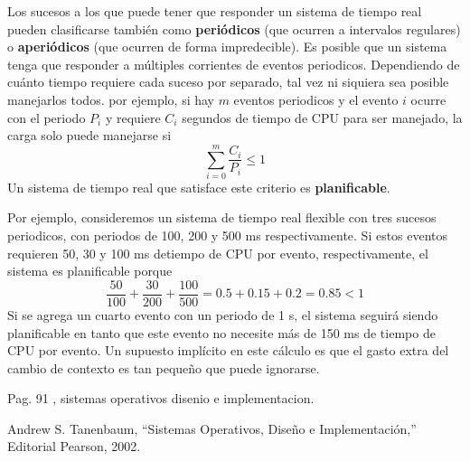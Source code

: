 \documentclass{article}
\begin{document}
Los sucesos a los que puede tener que responder un sistema de tiempo real 
pueden clasif\/icarse tambi\'en como {\bf peri\'odicos} (que ocurren a intervalos 
regulares) o {\bf aperi\'odicos} (que ocurren de forma impredecible). Es posible 
que un sistema tenga que responder a m\'ultiples corrientes de eventos 
periodicos. Dependiendo de cu\'anto tiempo requiere cada suceso por separado, 
tal vez ni siquiera sea posible manejarlos todos. por ejemplo, si hay $m$ 
eventos periodicos y el evento $i$ ocurre con el periodo $P_{i}$ y requiere 
$C_{i}$ segundos de tiempo de CPU para ser manejado, la carga solo puede 
manejarse si
$$
\sum_{i=0}^{m}\frac{C_{i}}{P_{i}}\leq 1
$$
Un sistema de tiempo real que satisface este criterio es {\bf planif\/icable}.

Por ejemplo, consideremos un sistema de tiempo real flexible con tres 
sucesos periodicos, con periodos de 100, 200 y 500 ms respectivamente. Si estos 
eventos requieren 50, 30 y 100 ms detiempo de CPU por evento, respectivamente, 
el sistema es planif\/icable porque 
$$
\frac{50}{100}+\frac{30}{200}+\frac{100}{500}=0.5+0.15+0.2=0.85<1
$$
Si se agrega un cuarto evento con un periodo de 1 s, el sistema seguir\'a 
siendo planif\/icable en tanto que este evento no necesite m\'as de 150 ms de 
tiempo de CPU por evento. Un supuesto impl\'icito en este c\'alculo es que el 
gasto extra del cambio de contexto es tan peque\~no que puede ignorarse.


Pag. 91 \cite{Tanenbaum}, sistemas operativos disenio e implementacion.

\begin{thebibliography}{9}
Andrew S. Tanenbaum, ``Sistemas Operativos, 
Dise\~no e Implementaci\'on,'' Editorial Pearson, 2002.
\end{thebibliography}
\end{document}
